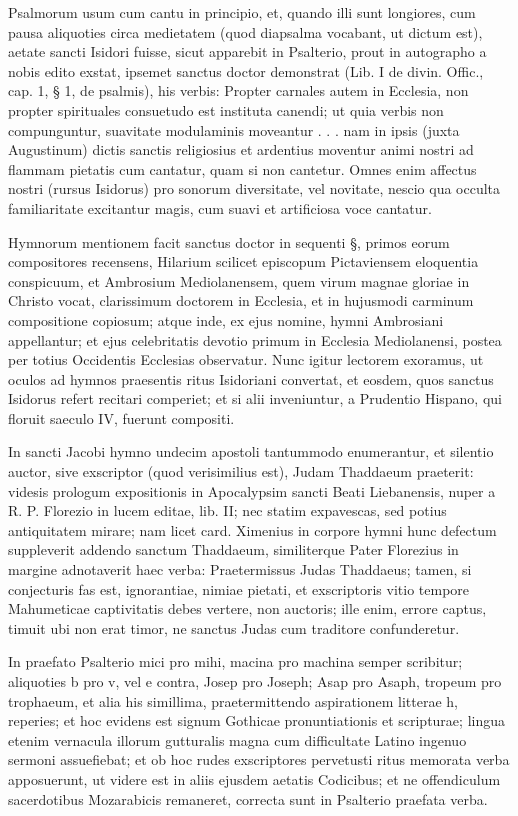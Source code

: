 \documentclass[letter,11pt]{book}
\begin{document}
Psalmorum usum cum cantu in principio, et, quando illi sunt longiores, cum pausa aliquoties circa medietatem (quod diapsalma vocabant, ut dictum est), aetate sancti Isidori fuisse, sicut apparebit in Psalterio, prout in autographo a nobis edito exstat, ipsemet sanctus doctor demonstrat (Lib. I de divin. Offic., cap. 1, § 1, de psalmis), his verbis: Propter carnales autem in Ecclesia, non propter spirituales consuetudo est instituta canendi; ut quia verbis non compunguntur, suavitate modulaminis moveantur . . . nam in ipsis (juxta Augustinum) dictis sanctis religiosius et ardentius moventur animi nostri ad flammam pietatis cum cantatur, quam si non cantetur. Omnes enim affectus nostri (rursus Isidorus) pro sonorum diversitate, vel novitate, nescio qua occulta familiaritate excitantur magis, cum suavi et artificiosa voce cantatur.

Hymnorum mentionem facit sanctus doctor in sequenti §, primos eorum compositores recensens, Hilarium scilicet episcopum Pictaviensem eloquentia conspicuum, et Ambrosium Mediolanensem, quem virum magnae gloriae in Christo vocat, clarissimum doctorem in Ecclesia, et in hujusmodi carminum compositione copiosum; atque inde, ex ejus nomine, hymni Ambrosiani appellantur; et ejus celebritatis devotio primum in Ecclesia Mediolanensi, postea per totius Occidentis Ecclesias observatur. Nunc igitur lectorem exoramus, ut oculos ad hymnos praesentis ritus Isidoriani convertat, et eosdem, quos sanctus Isidorus refert recitari comperiet; et si alii inveniuntur, a Prudentio Hispano, qui floruit saeculo IV, fuerunt compositi.

In sancti Jacobi hymno undecim apostoli tantummodo enumerantur, et silentio auctor, sive exscriptor (quod verisimilius est), Judam Thaddaeum praeterit: videsis prologum expositionis in Apocalypsim sancti Beati Liebanensis, nuper a R. P. Florezio in lucem editae, lib. II; nec statim expavescas, sed potius antiquitatem mirare; nam licet card. Ximenius in corpore hymni hunc defectum suppleverit addendo sanctum Thaddaeum, similiterque Pater Florezius in margine adnotaverit haec verba: Praetermissus Judas Thaddaeus; tamen, si conjecturis fas est, ignorantiae, nimiae pietati, et exscriptoris vitio tempore Mahumeticae captivitatis debes vertere, non auctoris; ille enim, errore captus, timuit ubi non erat timor, ne sanctus Judas cum traditore confunderetur.

In praefato Psalterio mici pro mihi, macina pro machina semper scribitur; aliquoties b pro v, vel e contra, Josep pro Joseph; Asap pro Asaph, tropeum pro trophaeum, et alia his simillima, praetermittendo aspirationem litterae h, reperies; et hoc evidens est signum Gothicae pronuntiationis et scripturae; lingua etenim vernacula illorum gutturalis magna cum difficultate Latino ingenuo sermoni assuefiebat; et ob hoc rudes exscriptores pervetusti ritus memorata verba apposuerunt, ut videre est in aliis ejusdem aetatis Codicibus; et ne offendiculum sacerdotibus Mozarabicis remaneret, correcta sunt in Psalterio praefata verba.
\end{document}
